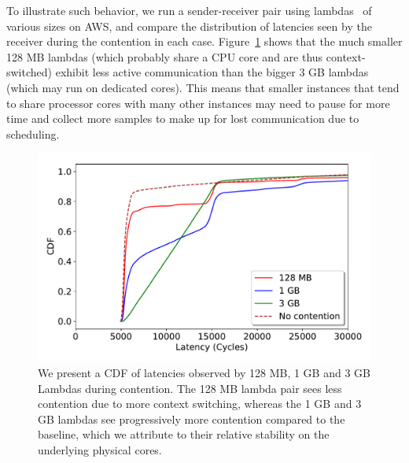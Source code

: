 To illustrate such behavior, we run a sender-receiver pair using
lambdas~\cite{awslambda} of various sizes on AWS, and compare the distribution
of latencies seen by the receiver during the contention in each case.
Figure~\ref{fig:context_switching} shows that the much smaller 128 MB lambdas
(which probably share a CPU core and are thus context-switched) exhibit less
active communication than the bigger 3 GB lambdas (which may run on dedicated
cores). This means that smaller instances that tend to share processor cores
with many other instances may need to pause for more time and collect more
samples to make up for lost communication due to scheduling.


\begin{figure}[!t]
  \includegraphics[width=.99\linewidth]{fig/lambda_sched_effect.pdf}
  \caption{We present a CDF of latencies observed by 128 MB, 1 GB and 3 GB
  Lambdas during contention. The 128 MB lambda pair sees less contention due to
  more context switching, whereas the 1 GB and 3 GB lambdas see progressively
  more contention compared to the baseline, which we attribute to their relative
  stability on the underlying physical cores. 
\label{fig:context_switching}}
\end{figure}


